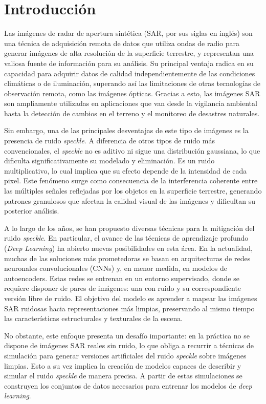 \chapter{Introducción}
Las imágenes de radar de apertura sintética (SAR, por sus siglas en inglés) son una técnica de adquisición remota de datos que utiliza ondas de radio para generar imágenes de alta resolución de la superficie terrestre, y representan una valiosa fuente de información para su análisis. Su principal ventaja radica en su capacidad para adquirir datos de calidad independientemente de las condiciones climáticas o de iluminación, superando así las limitaciones de otras tecnologías de observación remota, como las imágenes ópticas. Gracias a esto, las imágenes SAR son ampliamente utilizadas en aplicaciones que van desde la vigilancia ambiental hasta la detección de cambios en el terreno y el monitoreo de desastres naturales.

Sin embargo, una de las principales desventajas de este tipo de imágenes es la presencia de ruido \emph{speckle}. A diferencia de otros tipos de ruido más convencionales, el \emph{speckle} no es aditivo ni sigue una distribución gaussiana, lo que dificulta significativamente su modelado y eliminación. Es un ruido multiplicativo, lo cual implica que su efecto depende de la intensidad de cada pixel. Este fenómeno surge como consecuencia de la interferencia coherente entre las múltiples señales reflejadas por los objetos en la superficie terrestre, generando patrones granulosos que afectan la calidad visual de las imágenes y dificultan su posterior análisis.

A lo largo de los años, se han propuesto diversas técnicas para la mitigación del ruido \emph{speckle}. En particular, el avance de las técnicas de aprendizaje profundo (\textit{Deep Learning}) ha abierto nuevas posibilidades en esta área. En la actualidad, muchas de las soluciones más prometedoras se basan en arquitecturas de redes neuronales convolucionales (CNNs) y, en menor medida, en modelos de autoencoders. Estas redes se entrenan en un entorno supervisado, donde se requiere disponer de pares de imágenes: una con ruido y su correspondiente versión libre de ruido. El objetivo del modelo es aprender a mapear las imágenes SAR ruidosas hacia representaciones más limpias, preservando al mismo tiempo las características estructurales y texturales de la escena.

No obstante, este enfoque presenta un desafío importante: en la práctica no se dispone de imágenes SAR reales sin ruido, lo que obliga a recurrir a técnicas de simulación para generar versiones artificiales del ruido \emph{speckle} sobre imágenes limpias. Esto a su vez implica la creación de modelos capaces de describir y simular el ruido \emph{speckle} de manera precisa. A partir de estas simulaciones se construyen los conjuntos de datos necesarios para entrenar los modelos de \emph{deep learning}.

